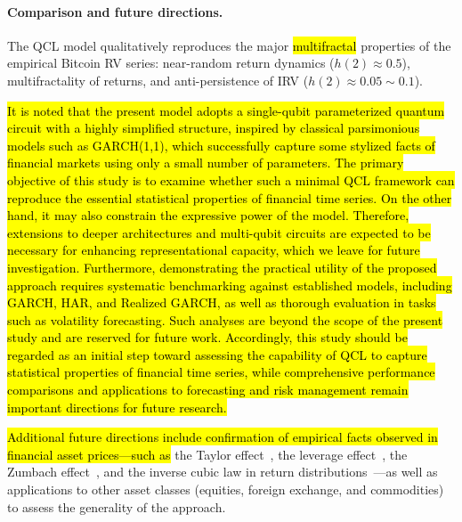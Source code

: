 \documentclass[preprints,article,accept,pdftex,oneauthor]{Definitions/mdpi}
\begin{document}
\paragraph{Comparison and future directions.}
The QCL model qualitatively reproduces the major \hl{multifractal}
properties of the empirical Bitcoin RV series: near-random return
dynamics ($h(2) \approx 0.5$), multifractality of returns, and
anti-persistence of IRV ($h(2) \approx 0.05 \sim 0.1$). 

\hl{It is noted that the present model adopts a single-qubit parameterized quantum circuit with a highly simplified structure, inspired by classical parsimonious models such as GARCH(1,1), which successfully capture some stylized facts of financial markets using only a small number of parameters. The primary objective of this study is to examine whether such a minimal QCL framework can reproduce the essential statistical properties of financial time series. On the other hand, it may also constrain the expressive power of the model. Therefore, extensions to deeper architectures and multi-qubit circuits are expected to be necessary for enhancing representational capacity, which we leave for future investigation.
Furthermore, demonstrating the practical utility of the proposed approach requires systematic benchmarking against established models, including GARCH, HAR, and Realized GARCH, as well as thorough evaluation in tasks such as volatility forecasting. Such analyses are beyond the scope of the present study and are reserved for future work. Accordingly, this study should be regarded as an initial step toward assessing the capability of QCL to capture statistical properties of financial time series, while comprehensive performance comparisons and applications to forecasting and risk management remain important directions for future research.}


\hl{Additional future directions include confirmation of empirical facts
observed in financial asset prices—such as} the Taylor
effect~\cite{takaishi2018taylor}, the leverage
effect~\cite{Black1976,Christie1982stochastic,
bouchaud2001leverage,qiu2006return,shen2009return,takaishi2020power}, the
Zumbach
effect~\cite{zumbach2003volatility,zumbach2009time,el2020zumbach}, and the
inverse cubic law in return
distributions~\cite{gopikrishnan1998inverse}—as well as applications to
other asset classes (equities, foreign exchange, and commodities) to
assess the generality of the approach.

\end{document}
